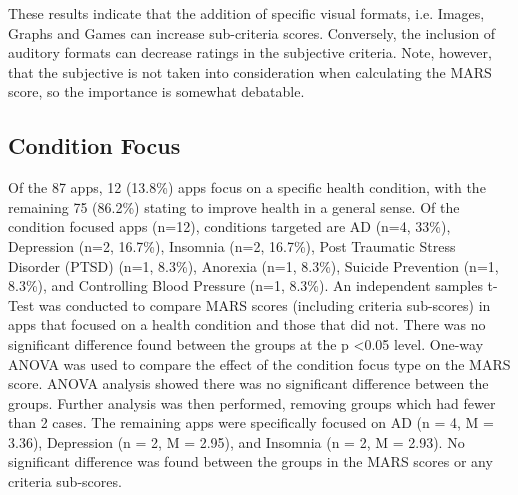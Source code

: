 These results indicate that the addition of specific visual formats, i.e. Images, Graphs and Games can increase sub-criteria scores. Conversely, the inclusion of auditory formats can decrease ratings in the subjective criteria. Note, however, that the subjective is not taken into consideration when calculating the MARS score, so the importance is somewhat debatable.

\subsection{Condition Focus}
Of the 87 apps, 12 (13.8\%) apps focus on a specific health condition, with the remaining 75 (86.2\%) stating to improve health in a general sense. Of the condition focused apps (n=12), conditions targeted are AD (n=4, 33\%), Depression (n=2, 16.7\%), Insomnia (n=2, 16.7\%), Post Traumatic Stress Disorder (PTSD) (n=1, 8.3\%), Anorexia (n=1, 8.3\%), Suicide Prevention (n=1, 8.3\%), and Controlling Blood Pressure (n=1, 8.3\%). An independent samples t-Test was conducted to compare MARS scores (including criteria sub-scores) in apps that focused on a health condition and those that did not. There was no significant difference found between the groups at the p \textless 0.05 level.
One-way ANOVA was used to compare the effect of the condition focus type on the MARS score. ANOVA analysis showed there was no significant difference between the groups. Further analysis was then performed, removing groups which had fewer than 2 cases. The remaining apps were specifically focused on AD (n = 4, M = 3.36), Depression (n = 2, M = 2.95), and Insomnia (n = 2, M = 2.93). No significant difference was found between the groups in the MARS scores or any criteria sub-scores.

